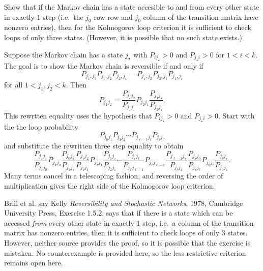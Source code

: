 \documentclass[12pt]{article}
\begin{document}
\begin{exercises}
\begin{exercise}
    Show that if the Markov chain has a state accesible to and from
    every other state in exactly \( 1 \)  step (i.e.\ the \( j_0 \) row
    row and \( j_{0} \) column of the
    transition matrix have nonzero entries), then for the Kolmogorov
    loop criterion it is sufficient to check loops of only three states.
    (However, it is possible that no such state exists.)
\end{exercise}
\begin{solution}
    Suppose the Markov chain has a state \( j_{\star} \) with \(
    P_{i j_{\star}} > 0 \) and \( P_{j_{\star} i} > 0 \) for \( 1 < i < k \).  The goal is to show
    the Markov chain is reversible if and only if
    \[
      P_{j_{\star}, j_1} P_{j_1, j_2} P_{j_2, j_{\star}} = P_{j_{\star}, j_2} P_{j_2,
        j_1} P_{j_1, j_{\star}}
    \]
    for all \( 1 < j_1, j_2 < k\).  Then
    \[
      P_{j_1 j_2} = \frac{P_{j_{\star} j_2}}{P_{j_{\star} j_1}} P_{j_2 j_1}
      \frac{P_{j_1 j_{\star}}}{P_{j_2 j_{\star}}}.
    \]
    This rewrtten equality uses the hypothesis that \(
    P_{i j_{\star}} > 0 \) and \( P_{j_{\star} i} > 0 \).
    Start with the the loop probability
    \[
      P_{j_0 j_1} P_{j_1 j_2} \cdots  P_{j_{\ell-1} j_\ell} P_{j_\ell j_0}
    \]
    and substitute the rewritten three step equality to obtain
    \[
      \frac{P_{j_{\star} j_1}}{P_{j_{\star} j_0}} P_{j_1 j_0}
      \frac{P_{j_0 j_{\star}}}{P_{j_1 j_{\star}}}
      \frac{P_{j_{\star} j_2}}{P_{j_{\star} j_1}} P_{j_2 j_1}
      \frac{P_{j_1 j_{\star}}}{P_{j_2 j_{\star}}}
      \cdots
      \frac{P_{j_{\star} j_\ell}}{P_{j_{\star} j_{\ell-1}}} P_{j_\ell j_{\ell-1}}
      \frac{P_{j_{\ell-1} j_{\star}}}{P_{j_\ell j_{\star}}}
      \frac{P_{j_{\star} j_0}}{P_{j_{\star} j_\ell}} P_{j_0 j_\ell}
      \frac{P_{j_\ell j_{\star}}}{P_{j_0 j_{\star}}}.
    \]
    Many terms cancel in a telescoping fashion, and reversing the order of
            multiplication gives the right side of the Kolmogorov loop
            criterion.
            
    Brill et al. say Kelly \emph{Reversibility and Stochastic
      Networks}, 1978, Cambridge University Press, Exercise 1.5.2, says that if there is a
    state which can be accessed \emph{from} every other state in exactly \(
    1 \) step, i.e.\ a column of the
    transition matrix has nonzero entries, then it is sufficient to
    check loops of only \( 3 \) states.  However, neither source
    provides the proof, so it is possible that the exercise is
    mistaken.  No counterexample is provided here, so the less
    restrictive criterion remains open here.
\end{solution}
\end{exercises}
\hr
\end{document}
